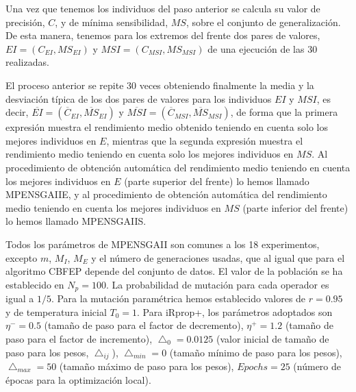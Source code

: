 Una vez que tenemos los individuos del paso anterior se calcula su valor de precisión,
$C$, y de mínima sensibilidad, $MS$, sobre el conjunto de generalización. De esta manera,
tenemos para los extremos del frente dos pares de valores, $\displaystyle
EI=(C_{EI},MS_{EI})$ y
$\displaystyle MSI=(C_{MSI},MS_{MSI})$ de una ejecución de las 30 realizadas.

El proceso anterior se repite 30 veces obteniendo finalmente la media y la desviación
típica de los dos pares de valores para los individuos $EI$ y $MSI$, es decir,
$\displaystyle \overline{EI}=(\overline{C}_{EI},\overline{MS}_{EI})$ y
$\displaystyle \overline{MSI}=(\overline{C}_{MSI},\overline{MS}_{MSI})$, de forma que la
primera expresión muestra el rendimiento medio obtenido teniendo en cuenta solo los
mejores individuos en $E$, mientras que la segunda expresión muestra el rendimiento
medio teniendo en cuenta solo los mejores individuos en $MS$. Al
procedimiento de obtención automática del rendimiento medio teniendo en cuenta los
mejores individuos en $E$ (parte superior del frente) lo hemos llamado MPENSGAIIE, y al
procedimiento de obtención automática del rendimiento medio teniendo en cuenta los mejores
individuos en $MS$ (parte inferior del frente) lo hemos llamado MPENSGAIIS.

Todos los parámetros de MPENSGAII son comunes a los 18 experimentos, excepto $m$,
$M_{I}$, $M_{E}$ y el número de generaciones usadas, que al igual que para el
algoritmo  CBFEP depende del conjunto de datos. El valor de la población se ha
establecido en $N_{p}=100$. La probabilidad de mutación para cada operador es igual a
$1/5$. Para la mutación paramétrica hemos establecido valores de $r=0.95$ y de
temperatura inicial $T_{0}=1$. Para iRprop+, los parámetros adoptados son $\eta^{-}=0.5$
(tamaño de paso para el factor de decremento), $\eta^{+}=1.2$ (tamaño de paso para el
factor de incremento), $\bigtriangleup_{0} =0.0125$ (valor inicial de tamaño de paso para
los pesos, $\bigtriangleup_{ij}$),  $\bigtriangleup_{min} =0$ (tamaño mínimo de paso para
los pesos), $\bigtriangleup_{max} =50$ (tamaño máximo de paso para los pesos), $Epochs=25$
(número de épocas para la optimización local).

